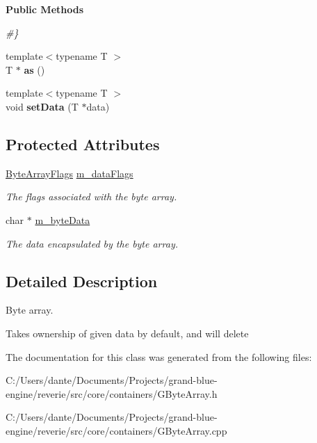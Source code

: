 \begin{Indent}\textbf{ Public Methods}\par
{\em \#\} }\begin{DoxyCompactItemize}
\item 
\mbox{\label{classrev_1_1_byte_array_afa026cbd22e5efe25dc94e01d5118c00}} 
{\footnotesize template$<$typename T $>$ }\\T $\ast$ {\bfseries as} ()
\item 
\mbox{\label{classrev_1_1_byte_array_a95e30bd536e388225511da99f129a77d}} 
{\footnotesize template$<$typename T $>$ }\\void {\bfseries set\+Data} (T $\ast$data)
\end{DoxyCompactItemize}
\end{Indent}
\subsection*{Protected Attributes}
\begin{DoxyCompactItemize}
\item 
\mbox{\label{classrev_1_1_byte_array_a193cd9d6d65d8674ba0918015a263a6d}} 
\mbox{\hyperlink{classrev_1_1_flags}{Byte\+Array\+Flags}} \mbox{\hyperlink{classrev_1_1_byte_array_a193cd9d6d65d8674ba0918015a263a6d}{m\+\_\+data\+Flags}}
\begin{DoxyCompactList}\small\item\em The flags associated with the byte array. \end{DoxyCompactList}\item 
\mbox{\label{classrev_1_1_byte_array_af85803b5402c3af84aae2cdca1470e78}} 
char $\ast$ \mbox{\hyperlink{classrev_1_1_byte_array_af85803b5402c3af84aae2cdca1470e78}{m\+\_\+byte\+Data}}
\begin{DoxyCompactList}\small\item\em The data encapsulated by the byte array. \end{DoxyCompactList}\end{DoxyCompactItemize}


\subsection{Detailed Description}
Byte array. 

Takes ownership of given data by default, and will delete 

The documentation for this class was generated from the following files\+:\begin{DoxyCompactItemize}
\item 
C\+:/\+Users/dante/\+Documents/\+Projects/grand-\/blue-\/engine/reverie/src/core/containers/G\+Byte\+Array.\+h\item 
C\+:/\+Users/dante/\+Documents/\+Projects/grand-\/blue-\/engine/reverie/src/core/containers/G\+Byte\+Array.\+cpp\end{DoxyCompactItemize}
